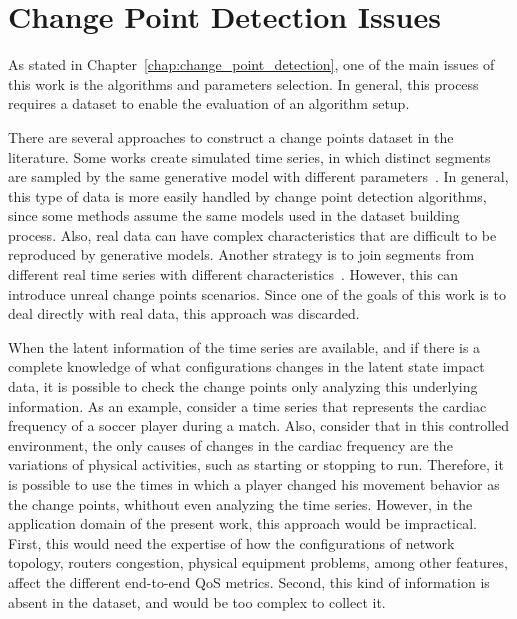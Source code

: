 \section{Change Point Detection Issues}

As stated in Chapter~\ref{chap:change_point_detection}, one of the main issues
of this work is the algorithms and parameters selection.
In general, this process requires a dataset to enable the evaluation of an
algorithm setup.

There are several approaches to construct a
change points dataset in the literature.
Some works create simulated time series, in which distinct segments are sampled
by the same generative model with different
parameters~\cite{change_point_detection_in_time_series_data_by_relative_density_ratio_estimation}.
In general, this type of data is more easily handled by change point detection
algorithms, since some methods assume the same models used in the dataset
building process. Also, real data can have complex characteristics that are
difficult to be reproduced by generative models. Another strategy is to join
segments from different real time series with different
characteristics~\cite{inertial_hidden_markov_models_modeling_change_in_multivariate_time_series}.
However, this can introduce unreal change points scenarios. Since one of
the goals of this work is to deal directly with real data,
this approach was discarded.

When the latent information of the time series are available, and if there is a
complete knowledge of what configurations changes in the latent state impact
data, it is possible to check the change points only analyzing this underlying
information. As an example, consider a time series that represents the cardiac
frequency of a soccer player during a match. Also, consider that in this
controlled environment, the only causes of changes in the cardiac frequency are
the variations of physical activities, such as starting or stopping to run.
Therefore,
it is possible to use the times in which a player changed his movement behavior
as the change points, whithout even analyzing the time series. However, in the
application domain of the present work, this approach would be impractical.
First, this would need the expertise of how the configurations of network
topology, routers congestion, physical equipment problems, among other features,
affect the different end-to-end QoS metrics.
Second, this kind of information is absent in the dataset, and would be too
complex to collect it.

